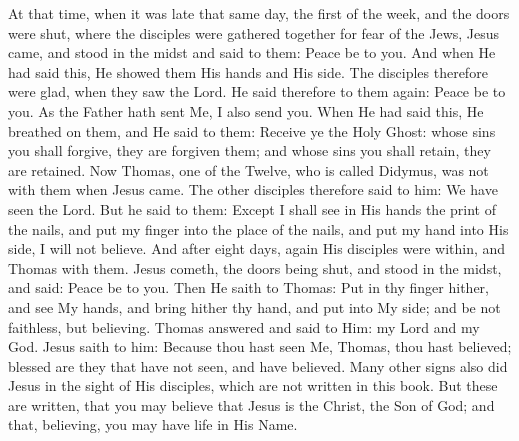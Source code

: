 {{At that time, when it was late that same day, the first of the week, and the doors were shut, where the disciples were gathered together for fear of the Jews, Jesus came, and stood in the midst and said to them: Peace be to you. And when He had said this, He showed them His hands and His side. The disciples therefore were glad, when they saw the Lord. He said therefore to them again: Peace be to you. As the Father hath sent Me, I also send you. When He had said this, He breathed on them, and He said to them: Receive ye the Holy Ghost: whose sins you shall forgive, they are forgiven them; and whose sins you shall retain, they are retained. Now Thomas, one of the Twelve, who is called Didymus, was not with them when Jesus came. The other disciples therefore said to him: We have seen the Lord. But he said to them: Except I shall see in His hands the print of the nails, and put my finger into the place of the nails, and put my hand into His side, I will not believe. And after eight days, again His disciples were within, and Thomas with them. Jesus cometh, the doors being shut, and stood in the midst, and said: Peace be to you. Then He saith to Thomas: Put in thy finger hither, and see My hands, and bring hither thy hand, and put into My side; and be not faithless, but believing. Thomas answered and said to Him: my Lord and my God. Jesus saith to him: Because thou hast seen Me, Thomas, thou hast believed; blessed are they that have not seen, and have believed. Many other signs also did Jesus in the sight of His disciples, which are not written in this book. But these are written, that you may believe that Jesus is the Christ, the Son of God; and that, believing, you may have life in His Name.
  }
}
\newcommand{\offertory}{%
Angelus Dómini descéndit de cœlo, et dixit muliéribus: Quem quǽritis, surréxit, sicut dixit, allelúia.
}
\newcommand{\offertoryTranslation}{%
An Angel of the Lord descended from heaven, and said to the women; He whom you seek is risen, as He said. Alleluia.
}
\newcommand{\secret}{%
  \l{%
Súscipe múnera, Dómine, quǽsumus, exsultántis Ecclésiæ: et, cui causam tanti gáudii præstitísti, perpétuæ fructum concéde lætítiæ.
  }
  \e{%
Receive, we beseech Thee, O Lord, the gifts of Thine exultant Church: and to her whom Thou hast given cause for so great joy, grant the fruit of perpetual happiness.
  }
  \per
}
\newcommand{\communion}{%
Mitte manum tuam, et cognósce loca clavórum, allelúia: et noli esse incrédulus, sed fidélis, allelúia, allelúia.
}
\newcommand{\communionTranslation}{%
Put in thy hand, and know the place of the nails, alleluia; and be not faithless, but believing, alleluia, alleluia.
}
\newcommand{\postcommunion}{%
  \l{%
Quǽsumus, Dómine, Deus noster: ut sacrosáncta mystéria, quæ pro reparatiónis nostræ munímine contulísti; et præsens nobis remédium esse fácias et futúrum.
  }
  \e{%
We beseech Thee, O Lord, our God, to make the most holy Mysteries which Thou hast given us as a defense of our renewal, a remedy for us now, and in the future.
  }
  \per
}

